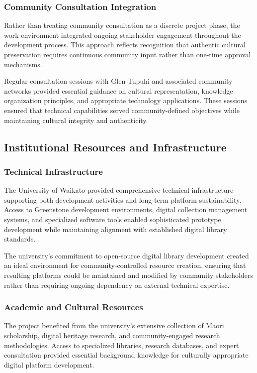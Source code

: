 \subsubsection{Community Consultation Integration}

Rather than treating community consultation as a discrete project phase, the work environment integrated ongoing stakeholder engagement throughout the development process. This approach reflects recognition that authentic cultural preservation requires continuous community input rather than one-time approval mechanisms.

Regular consultation sessions with Glen Tupuhi and associated community networks provided essential guidance on cultural representation, knowledge organization principles, and appropriate technology applications. These sessions ensured that technical capabilities served community-defined objectives while maintaining cultural integrity and authenticity.

\subsection{Institutional Resources and Infrastructure}

\subsubsection{Technical Infrastructure}

The University of Waikato provided comprehensive technical infrastructure supporting both development activities and long-term platform sustainability. Access to Greenstone development environments, digital collection management systems, and specialized software tools enabled sophisticated prototype development while maintaining alignment with established digital library standards.

The university's commitment to open-source digital library development created an ideal environment for community-controlled resource creation, ensuring that resulting platforms could be maintained and modified by community stakeholders rather than requiring ongoing dependency on external technical expertise.

\subsubsection{Academic and Cultural Resources}

The project benefited from the university's extensive collection of M\=aori scholarship, digital heritage research, and community-engaged research methodologies. Access to specialized libraries, research databases, and expert consultation provided essential background knowledge for culturally appropriate digital platform development.

